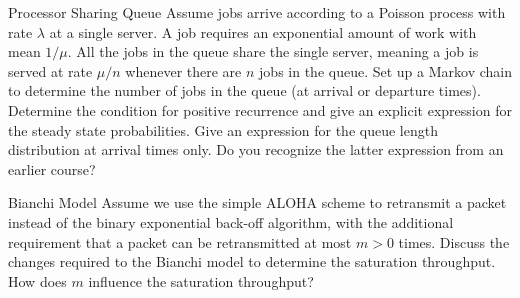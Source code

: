 \begin{problem}{Processor Sharing Queue}
Assume jobs arrive according to a Poisson process with rate $\lambda$ at a single server. A job requires an exponential amount of work with mean $1/\mu$. All the jobs in the queue share the single server, meaning a job is served at rate $\mu/n$ whenever there are $n$ jobs in the queue. Set up a Markov chain to determine the number of jobs in the queue (at arrival or departure times). Determine the condition for positive recurrence and give an explicit expression for the steady state probabilities. Give an expression for the queue length distribution at arrival times only. Do you recognize the latter expression from an earlier course?
\end{problem}

\begin{problem}{Bianchi Model}
Assume we use the simple ALOHA scheme to retransmit a packet instead of the binary exponential back-off algorithm, with the additional requirement that a packet can be retransmitted at most $m > 0$ times. Discuss the changes required to the Bianchi model to determine the saturation throughput. How does $m$ influence the saturation throughput?
\end{problem}
